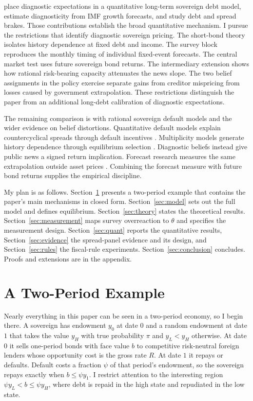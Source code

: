 \documentclass[11pt]{article}
\theoremstyle{definition}
\begin{document}
\citet{NiemannPrein2025} place diagnostic expectations in a quantitative long-term sovereign debt model, estimate diagnosticity from IMF growth forecasts, and study debt and spread brakes. Those contributions establish the broad quantitative mechanism. I pursue the restrictions that identify diagnostic sovereign pricing. The short-bond theory isolates history dependence at fixed debt and income. The survey block reproduces the monthly timing of individual fixed-event forecasts. The central market test uses future sovereign bond returns. The intermediary extension shows how rational risk-bearing capacity attenuates the news slope. The two belief assignments in the policy exercise separate gains from creditor mispricing from losses caused by government extrapolation. These restrictions distinguish the paper from an additional long-debt calibration of diagnostic expectations.

The remaining comparison is with rational sovereign default models and the wider evidence on belief distortions. Quantitative default models explain countercyclical spreads through default incentives \citep{AguiarGopinath2006, Arellano2008, ChatterjeeEyigungor2012, MendozaYue2012}. Multiplicity models generate history dependence through equilibrium selection \citep{ColeKehoe2000, LorenzoniWerning2019}. Diagnostic beliefs instead give public news a signed return implication. Forecast research measures the same extrapolation outside asset prices \citep{BordaloGennaioliMaShleifer2020}. Combining the forecast measure with future bond returns supplies the empirical discipline.

My plan is as follows. Section~\ref{sec:example} presents a two-period example that contains the paper's main mechanisms in closed form. Section~\ref{sec:model} sets out the full model and defines equilibrium. Section~\ref{sec:theory} states the theoretical results. Section~\ref{sec:measurement} maps survey overreaction to $\theta$ and specifies the measurement design. Section~\ref{sec:quant} reports the quantitative results, Section~\ref{sec:evidence} the spread-panel evidence and its design, and Section~\ref{sec:rules} the fiscal-rule experiments. Section~\ref{sec:conclusion} concludes. Proofs and extensions are in the appendix.

\section{A Two-Period Example}\label{sec:example}

Nearly everything in this paper can be seen in a two-period economy, so I begin there. A sovereign has endowment $y_0$ at date $0$ and a random endowment at date $1$ that takes the value $y_H$ with true probability $\pi$ and $y_L < y_H$ otherwise. At date $0$ it sells one-period bonds with face value $b$ to competitive risk-neutral foreign lenders whose opportunity cost is the gross rate $R$. At date $1$ it repays or defaults. Default costs a fraction $\psi$ of that period's endowment, so the sovereign repays exactly when $b \leq \psi y_1$. I restrict attention to the interesting region $\psi y_L < b \leq \psi y_H$, where debt is repaid in the high state and repudiated in the low state.
\end{document}

